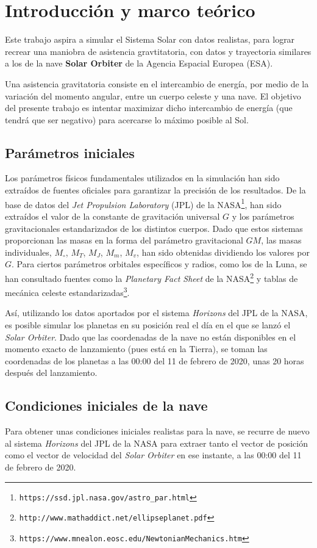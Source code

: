 \section{Introducción y marco teórico}
Este trabajo aspira a simular el Sistema Solar con datos realistas, para lograr recrear una 
maniobra de asistencia gravtitatoria, 
con datos y trayectoria similares a los de la nave \textbf{Solar Orbiter} de la Agencia Espacial Europea (ESA).

Una asistencia gravitatoria consiste en el intercambio de energía, por medio de la variación del momento angular, 
entre un cuerpo celeste y una nave.
El objetivo del presente trabajo es intentar maximizar dicho intercambio de energía (que tendrá que ser negativo) 
para acercarse lo 
máximo posible al Sol.

\subsection{Parámetros iniciales}
Los parámetros físicos fundamentales utilizados en la simulación han sido extraídos de fuentes oficiales para 
garantizar la precisión de los resultados. De la base de datos del \textit{Jet Propulsion Laboratory} (JPL) de 
la NASA\footnote{\texttt{https://ssd.jpl.nasa.gov/astro\_par.html}}, han sido extraídos el valor de la 
constante de gravitación universal $G$ y los 
parámetros gravitacionales estandarizados de los distintos cuerpos. Dado que estos sistemas proporcionan 
las masas en la forma del parámetro gravitacional $G M$, las masas individuales,
$M_\circ$, $M_T$, $M_J$, $M_m$, $M_v$, han sido obtenidas dividiendo los valores por $G$. 
Para ciertos parámetros orbitales específicos 
y radios, como los de la Luna, se han consultado fuentes como la \textit{Planetary Fact Sheet} de la 
NASA\footnote{\texttt{http://www.mathaddict.net/ellipseplanet.pdf}} y 
tablas de mecánica celeste estandarizadas\footnote{\texttt{https://www.mnealon.eosc.edu/NewtonianMechanics.htm}}.

Así, utilizando los datos aportados por el sistema \textit{Horizons} del JPL de la NASA, es posible simular 
los planetas en su posición real el día en el que se lanzó el \textit{Solar Orbiter}. Dado que las coordenadas 
de la nave no están disponibles en el momento exacto de lanzamiento (pues está en la Tierra), se toman las 
coordenadas de los planetas a las 00:00 del 11 de febrero de 2020, unas 20 horas después del lanzamiento.

\subsection{Condiciones iniciales de la nave}
Para obtener unas condiciones iniciales realistas para la nave, se recurre de nuevo al sistema 
\textit{Horizons} del JPL de la NASA para extraer tanto el vector de posición como el vector de velocidad 
del \textit{Solar Orbiter} en ese instante, a las 00:00 del 11 de febrero de 2020. 

